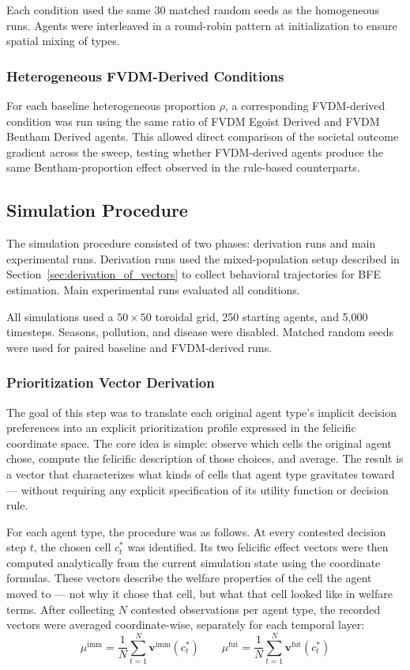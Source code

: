 \documentclass{icsthesis}
\begin{document}
\begin{mainmatter}
Each condition used the same 30 matched random seeds as the homogeneous runs. Agents were interleaved in a round-robin pattern at initialization to ensure spatial mixing of types.

\subsubsection{Heterogeneous FVDM-Derived Conditions}
For each baseline heterogeneous proportion $\rho$, a corresponding FVDM-derived condition was run using the same ratio of FVDM Egoist Derived and FVDM Bentham Derived agents. This allowed direct comparison of the societal outcome gradient across the sweep, testing whether FVDM-derived agents produce the same Bentham-proportion effect observed in the rule-based counterparts.

\subsection{Simulation Procedure}
The simulation procedure consisted of two phases: derivation runs and main experimental runs. Derivation runs used the mixed-population setup described in Section~\ref{sec:derivation_of_vectors} to collect behavioral trajectories for BFE estimation. Main experimental runs evaluated all conditions.

All simulations used a $50 \times 50$ toroidal grid, 250 starting agents, and 5,000 timesteps. Seasons, pollution, and disease were disabled. Matched random seeds were used for paired baseline and FVDM-derived runs.

\subsubsection{Prioritization Vector Derivation}
The goal of this step was to translate each original agent type's implicit decision preferences into an explicit prioritization profile expressed in the felicific coordinate space. The core idea is simple: observe which cells the original agent chose, compute the felicific description of those choices, and average. The result is a vector that characterizes what kinds of cells that agent type gravitates toward --- without requiring any explicit specification of its utility function or decision rule.

For each agent type, the procedure was as follows. At every contested decision step $t$, the chosen cell $c_t^*$ was identified. Its two felicific effect vectors were then computed analytically from the current simulation state using the coordinate formulas. These vectors describe the welfare properties of the cell the agent moved to --- not why it chose that cell, but what that cell looked like in welfare terms. After collecting $N$ contested observations per agent type, the recorded vectors were averaged coordinate-wise, separately for each temporal layer:
\[
\mu^{\mathrm{imm}} = \frac{1}{N}\sum_{t=1}^{N} \mathbf{v}^{\mathrm{imm}}(c_t^*)
\qquad
\mu^{\mathrm{fut}} = \frac{1}{N}\sum_{t=1}^{N} \mathbf{v}^{\mathrm{fut}}(c_t^*)
\]


\end{mainmatter}
\end{document}
